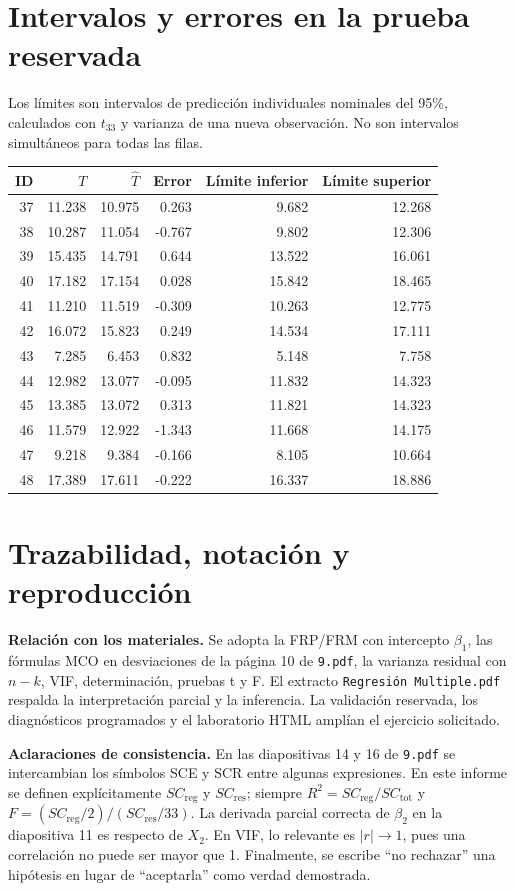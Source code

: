 \documentclass[11pt,a4paper]{article}
\begin{document}
\section{Intervalos y errores en la prueba reservada}
Los límites son intervalos de predicción individuales nominales del 95\%, calculados con $t_{33}$ y varianza de una nueva observación. No son intervalos simultáneos para todas las filas.
\begin{center}\small\begin{tabular}{rrrrrr}\toprule
ID & $T$ & $\widehat T$ & Error & Límite inferior & Límite superior\\\midrule
37 & 11.238 & 10.975 & 0.263 & 9.682 & 12.268\\
38 & 10.287 & 11.054 & -0.767 & 9.802 & 12.306\\
39 & 15.435 & 14.791 & 0.644 & 13.522 & 16.061\\
40 & 17.182 & 17.154 & 0.028 & 15.842 & 18.465\\
41 & 11.210 & 11.519 & -0.309 & 10.263 & 12.775\\
42 & 16.072 & 15.823 & 0.249 & 14.534 & 17.111\\
43 & 7.285 & 6.453 & 0.832 & 5.148 & 7.758\\
44 & 12.982 & 13.077 & -0.095 & 11.832 & 14.323\\
45 & 13.385 & 13.072 & 0.313 & 11.821 & 14.323\\
46 & 11.579 & 12.922 & -1.343 & 11.668 & 14.175\\
47 & 9.218 & 9.384 & -0.166 & 8.105 & 10.664\\
48 & 17.389 & 17.611 & -0.222 & 16.337 & 18.886\\
\bottomrule\end{tabular}\end{center}

\section{Trazabilidad, notación y reproducción}
\textbf{Relación con los materiales.} Se adopta la FRP/FRM con intercepto $\beta_1$, las fórmulas MCO en desviaciones de la página 10 de \texttt{9.pdf}, la varianza residual con $n-k$, VIF, determinación, pruebas t y F. El extracto \texttt{Regresión Multiple.pdf} respalda la interpretación parcial y la inferencia. La validación reservada, los diagnósticos programados y el laboratorio HTML amplían el ejercicio solicitado.

\textbf{Aclaraciones de consistencia.} En las diapositivas 14 y 16 de \texttt{9.pdf} se intercambian los símbolos SCE y SCR entre algunas expresiones. En este informe se definen explícitamente $SC_{\mathrm{reg}}$ y $SC_{\mathrm{res}}$; siempre $R^2=SC_{\mathrm{reg}}/SC_{\mathrm{tot}}$ y $F=(SC_{\mathrm{reg}}/2)/(SC_{\mathrm{res}}/33)$. La derivada parcial correcta de $\beta_2$ en la diapositiva 11 es respecto de $X_2$. En VIF, lo relevante es $|r|\to1$, pues una correlación no puede ser mayor que 1. Finalmente, se escribe ``no rechazar'' una hipótesis en lugar de ``aceptarla'' como verdad demostrada.
\end{document}

